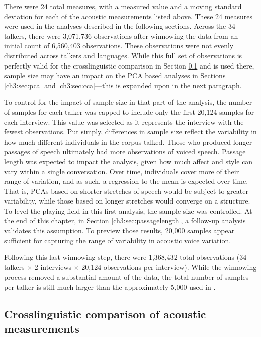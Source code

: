 There were 24 total measures, with a measured value and a moving standard deviation for each of the acoustic measurements listed above. These 24 measures were used in the analyses described in the following sections. Across the 34 talkers, there were 3,071,736 observations after winnowing the data from an initial count of 6,560,403 observations. These observations were not evenly distributed across talkers and languages. While this full set of observations is perfectly valid for the crosslinguistic comparison in Section \ref{ch3:sec:comparison} and is used there, sample size may have an impact on the PCA based analyses in Sections \ref{ch3:sec:pca} and \ref{ch3:sec:cca}---this is expanded upon in the next paragraph.

To control for the impact of sample size in that part of the analysis, the number of samples for each talker was capped to include only the first 20,124 samples for each interview. This value was selected as it represents the interview with the fewest observations. Put simply, differences in sample size reflect the variability in how much different individuals in the corpus talked. Those who produced longer passages of speech ultimately had more observations of voiced speech. Passage length was expected to impact the analysis, given how much affect and style can vary within a single conversation. Over time, individuals cover more of their range of variation, and as such, a regression to the mean is expected over time. That is, PCAs based on shorter stretches of speech would be subject to greater variability, while those based on longer stretches would converge on a structure. To level the playing field in this first analysis, the sample size was controlled. At the end of this chapter, in Section \ref{ch3:sec:passagelength}, a follow-up analysis validates this assumption. To preview those results, 20,000 samples appear sufficient for capturing the range of variability in acoustic voice variation.

Following this last winnowing step, there were 1,368,432 total observations (34 talkers $\times$ 2 interviews $\times$ 20,124 observations per interview). While the winnowing process removed a substantial amount of the data, the total number of samples per talker is still much larger than the approximately 5,000 used in \citet{lee_2019_acoustic}. 

\subsection{Crosslinguistic comparison of acoustic measurements}\label{ch3:sec:comparison}

